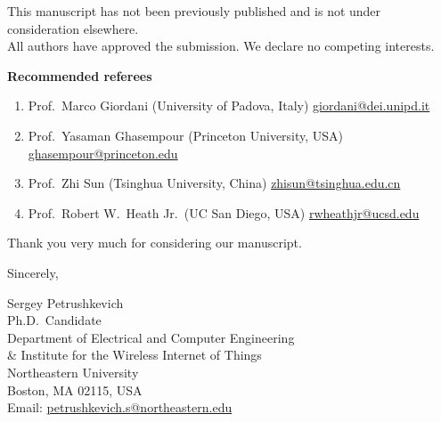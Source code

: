 \documentclass[11pt]{letter}
\begin{document}
\medskip
\noindent
This manuscript has not been previously published and is not under consideration elsewhere.\\All authors have approved the submission. We declare no competing interests.

\medskip
\noindent
\textbf{Recommended referees}
\begin{enumerate}[leftmargin=1.5em, itemsep=2pt]
    \item Prof.\ Marco Giordani (University of Padova, Italy) \href{mailto:giordani@dei.unipd.it}{giordani@dei.unipd.it}
    \item Prof.\ Yasaman Ghasempour (Princeton University, USA) \href{mailto:ghasempour@princeton.edu}{ghasempour@princeton.edu}
    \item Prof.\ Zhi Sun (Tsinghua University, China) \href{mailto:zhisun@tsinghua.edu.cn}{zhisun@tsinghua.edu.cn}
    \item Prof.\ Robert W.\ Heath Jr.\ (UC San Diego, USA) \href{mailto:rwheathjr@ucsd.edu}{rwheathjr@ucsd.edu}
\end{enumerate}

\medskip
\noindent
Thank you very much for considering our manuscript.

\bigskip
\noindent
Sincerely,

\noindent
Sergey Petrushkevich\\
Ph.D.\ Candidate\\
Department of Electrical and Computer Engineering\\
\& Institute for the Wireless Internet of Things\\
Northeastern University\\
Boston, MA 02115, USA\\
Email: \href{mailto:petrushkevich.s@northeastern.edu}{petrushkevich.s@northeastern.edu}
\end{document}
